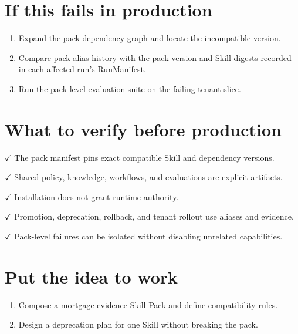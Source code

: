 \section{If this fails in production}

\begin{enumerate}

\item Expand the pack dependency graph and locate the incompatible version.

\item Compare pack alias history with the pack version and Skill digests recorded in each affected run's RunManifest.

\item Run the pack-level evaluation suite on the failing tenant slice.

\end{enumerate}

\section{What to verify before production}

\textbf{\ensuremath{\checkmark}} The pack manifest pins exact compatible Skill and dependency versions.\par

\textbf{\ensuremath{\checkmark}} Shared policy, knowledge, workflows, and evaluations are explicit artifacts.\par

\textbf{\ensuremath{\checkmark}} Installation does not grant runtime authority.\par

\textbf{\ensuremath{\checkmark}} Promotion, deprecation, rollback, and tenant rollout use aliases and evidence.\par

\textbf{\ensuremath{\checkmark}} Pack-level failures can be isolated without disabling unrelated capabilities.\par

\section{Put the idea to work}

\begin{enumerate}

\item Compose a mortgage-evidence Skill Pack and define compatibility rules.

\item Design a deprecation plan for one Skill without breaking the pack.

\end{enumerate}


